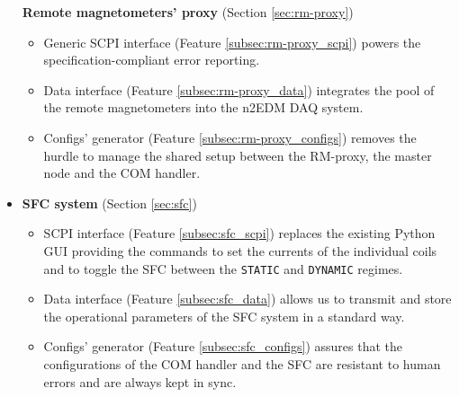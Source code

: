 \begin{itemize}
{		\textbf{Remote magnetometers' proxy} (Section \ref{sec:rm-proxy})
		\begin{itemize}
			\item Generic SCPI interface (Feature \ref{subsec:rm-proxy_scpi}) powers the specification-compliant \cite{SCPIConsortium1999} error reporting.
			\item Data interface (Feature \ref{subsec:rm-proxy_data}) integrates the pool of the remote magnetometers into the n2EDM DAQ system.
			\item Configs' generator (Feature \ref{subsec:rm-proxy_configs}) removes the hurdle to manage the shared setup between the RM-proxy, the master node and the COM handler.
		\end{itemize}
	}
	\item{
		\textbf{SFC system} (Section \ref{sec:sfc})
		\begin{itemize}
			\item SCPI interface (Feature \ref{subsec:sfc_scpi}) replaces the existing Python GUI providing the commands to set the currents of the individual coils and to toggle the SFC between the \texttt{STATIC} and \texttt{DYNAMIC} regimes.
			\item Data interface (Feature \ref{subsec:sfc_data}) allows us to transmit and store the operational parameters of the SFC system in a standard \cite{Bison2018} way. 
			\item Configs' generator (Feature \ref{subsec:sfc_configs}) assures that the configurations of the COM handler and the SFC are resistant to human errors and are always kept in sync.
		\end{itemize}
	}
\end{itemize}

